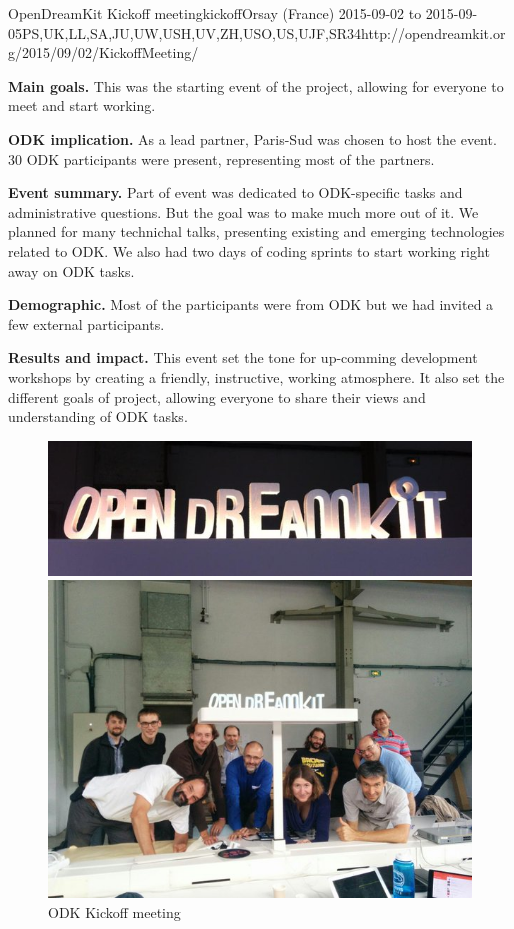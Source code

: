 \begin{event}{OpenDreamKit Kickoff meeting}{kickoff}{Orsay (France) 2015-09-02 to 2015-09-05}{PS,UK,LL,SA,JU,UW,USH,UV,ZH,USO,US,UJF,SR}{34}{http://opendreamkit.org/2015/09/02/KickoffMeeting/}

\textbf{Main goals.} This was the starting event of the project, allowing for everyone to meet and start working.

\textbf{ODK implication.} As a lead partner, Paris-Sud was chosen to host the event. 30 ODK participants were present, 
representing most of the partners.

\textbf{Event summary.} Part of event was dedicated to ODK-specific tasks and administrative questions. But the goal
was to make much more out of it. We planned for many technichal talks, presenting existing and emerging technologies
related to ODK. We also had two days of coding sprints to start working right away on ODK tasks.

\textbf{Demographic.} Most of the participants were from ODK but we had invited a few external participants.

\textbf{Results and impact.} This event set the tone for up-comming development workshops by creating a friendly, instructive, 
working atmosphere. It also set the different goals of project, allowing everyone to share their views and
understanding of ODK tasks.

\begin{figure}[ht]
\caption*{ODK Kickoff meeting}
\includegraphics[scale=0.3]{pictures/kickoff1.jpg}

\includegraphics[scale=0.5]{pictures/kickoff2.jpg}
\end{figure}



\end{event}